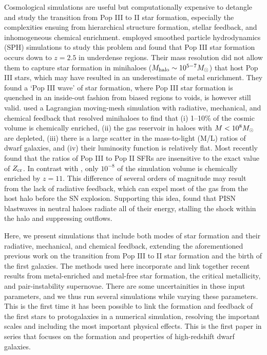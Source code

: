\documentclass[useAMS,usenatbib]{mn2e}
\begin{document}
Cosmological simulations are useful but computationally expensive to
detangle and study the transition from Pop III to II star formation,
especially the complexities ensuing from hierarchical structure
formation, stellar feedback, and inhomogeneous chemical enrichment.
\citeauthor{Tornatore07} employed smoothed particle hydrodynamics
(SPH) simulations to study this problem and found that Pop III star
formation occurs down to $z=2.5$ in underdense regions.  Their mass
resolution did not allow them to capture star formation in minihaloes
($M_{\rm halo} \sim 10^{5-7} \Ms$) that host Pop III stars, which may
have resulted in an underestimate of metal enrichment.  They found a
`Pop III wave' of star formation, where Pop III star formation is
quenched in an inside-out fashion from biased regions to voids, is
however still valid.  \citeauthor{Ricotti08} used a Lagrangian
moving-mesh simulation with radiative, mechanical, and chemical
feedback that resolved minihaloes to find that (i) 1--10\% of the
cosmic volume is chemically enriched, (ii) the gas reservoir in haloes
with $M < 10^8 \Ms$ are depleted, (iii) there is a large scatter in
the mass-to-light (M/L) ratios of dwarf galaxies, and (iv) their
luminosity function is relatively flat.  Most recently
\citeauthor{Maio10_Pop32} found that the ratios of Pop III to Pop II
SFRs are insensitive to the exact value of $Z_{\rm cr}$.  In contrast
with \citeauthor{Ricotti08}, only $10^{-8}$ of the simulation volume
is chemically enriched by $z=11$.  This difference of several orders
of magnitude may result from the lack of radiative feedback, which can
expel most of the gas from the host halo before the SN explosion.
Supporting this idea, \citet{Whalen08_SN} found that PISN blastwaves
in neutral haloes radiate all of their energy, stalling the shock
within the halo and suppressing outflows.

Here, we present simulations that include both modes of star formation
and their radiative, mechanical, and chemical feedback, extending the
aforementioned previous work on the transition from Pop III to II star
formation and the birth of the first galaxies.  The methods used here
incorporate and link together recent results from metal-enriched and
metal-free star formation, the critical metallicity, and
pair-instability supernovae.  There are some uncertainities in these
input parameters, and we thus run several simulations while varying
these parameters.  This is the first time it has been possible to link
the formation and feedback of the first stars to protogalaxies in a
numerical simulation, resolving the important scales and including the
most important physical effects.  This is the first paper in series
that focuses on the formation and properties of high-redshift dwarf
galaxies.
\end{document}
